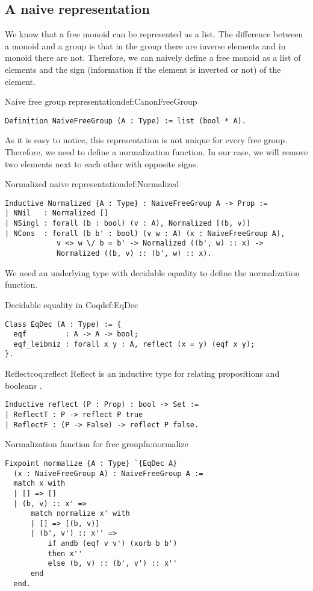 \subsection{A naive representation}
We know that a free monoid can be represented as a list. The difference between a monoid and a group is that in the group there are inverse elements and in monoid there are not. Therefore, we can naively define a free monoid as a list of elements and the sign (information if the element is inverted or not) of the element.
\begin{defi}{Naive free group representation}{def:CanonFreeGroup}
\begin{verbatim}
Definition NaiveFreeGroup (A : Type) := list (bool * A).
\end{verbatim}
\end{defi}
As it is easy to notice, this representation is not unique for every free group. Therefore, we need to define a normalization function. In our case, we will remove two elements next to each other with opposite signs.
\begin{defi}{Normalized naive representation}{def:Normalized}
\begin{verbatim}
Inductive Normalized {A : Type} : NaiveFreeGroup A -> Prop :=
| NNil   : Normalized []
| NSingl : forall (b : bool) (v : A), Normalized [(b, v)]
| NCons  : forall (b b' : bool) (v w : A) (x : NaiveFreeGroup A), 
            v <> w \/ b = b' -> Normalized ((b', w) :: x) ->
            Normalized ((b, v) :: (b', w) :: x).
\end{verbatim}
\end{defi}
We need an underlying type with decidable equality to define the normalization function.
\begin{defi}{Decidable equality in Coq}{def:EqDec}
\begin{verbatim}
Class EqDec (A : Type) := { 
  eqf         : A -> A -> bool;
  eqf_leibniz : forall x y : A, reflect (x = y) (eqf x y);
}.
\end{verbatim}
\end{defi}
\begin{coq}{Reflect}{coq:reflect}
Reflect is an inductive type for
relating propositions and booleans \cite{coqDoc}.
\begin{verbatim}
Inductive reflect (P : Prop) : bool -> Set :=
| ReflectT : P -> reflect P true
| ReflectF : (P -> False) -> reflect P false.
\end{verbatim}
\end{coq}
\begin{func}{Normalization function for free group}{fn:normalize}
\begin{verbatim}
Fixpoint normalize {A : Type} `{EqDec A} 
  (x : NaiveFreeGroup A) : NaiveFreeGroup A :=
  match x with
  | [] => []
  | (b, v) :: x' => 
      match normalize x' with
      | [] => [(b, v)]
      | (b', v') :: x'' => 
          if andb (eqf v v') (xorb b b')
          then x''
          else (b, v) :: (b', v') :: x''
      end
  end.
\end{verbatim}
\end{func}
